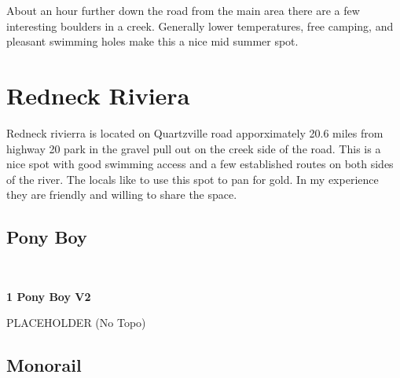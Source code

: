 \raggedcolumns
\begin{multicols}{2}
\begin{minipage}{\columnwidth}
About an hour further down the road from the main area there are a few interesting boulders in a creek. Generally lower temperatures, free camping, and pleasant swimming holes make this a nice mid summer spot.
\end{minipage}

\newpage
		\section{Redneck Riviera}\label{sa:Redneck Riviera}
	\begin{minipage}{\columnwidth}
	Redneck rivierra is located on Quartzville road apporximately 20.6 miles from highway 20 park in the gravel pull out on the creek side of the road. This is a nice spot with good swimming access and a few established routes on both sides of the river. The locals like to use this spot to pan for gold. In my experience they are friendly and willing to share the space.
	\end{minipage}
	
			\begin{minipage}{\columnwidth}
			\subsection*{Pony Boy}\label{bf:Pony Boy}
			\
			
			\end{minipage}
			
					\begin{minipage}{\linewidth}	
					\label{rt:Pony Boy}
\colorbox{green!20}{
\parbox{0.95\textwidth}{
\textbf{
1 Pony Boy V2  
}
}
}

					\begin{adjustwidth}{0.5cm}{}				
					PLACEHOLDER
						\newline (No Topo) 
					\end{adjustwidth}
					\end{minipage}
			\begin{minipage}{\columnwidth}
			\subsection*{Monorail}\label{bf:Monorail}
			\
			

\end{minipage}
\end{multicols}
